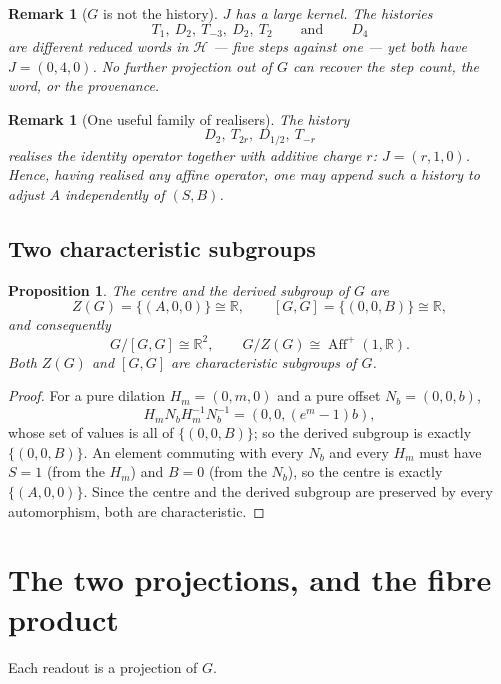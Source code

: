 \documentclass[11pt]{article}
\newtheorem{proposition}[theorem]{Proposition}
\newtheorem{remark}[theorem]{Remark}
\begin{document}
\begin{remark}[$G$ is not the history]
\label{rem:not-history}
$J$ has a large kernel. The histories
\[
T_1,\ D_2,\ T_{-3},\ D_2,\ T_2
\qquad\text{and}\qquad
D_4
\]
are different reduced words in $\mathcal H$ --- five steps against one --- yet
both have $J=(0,4,0)$. No further projection out of $G$ can recover the step
count, the word, or the provenance.
\end{remark}

\begin{remark}[One useful family of realisers]
The history
\[
D_2,\ T_{2r},\ D_{1/2},\ T_{-r}
\]
realises the identity operator together with additive charge $r$:
$J=(r,1,0)$. Hence, having realised any affine operator, one may append such a
history to adjust $A$ independently of $(S,B)$.
\end{remark}

\subsection{Two characteristic subgroups}
\label{subsec:characteristic}

\begin{proposition}
\label{prop:center-derived}
The centre and the derived subgroup of $G$ are
\[
Z(G)=\{(A,0,0)\}\cong\mathbb R,
\qquad
[G,G]=\{(0,0,B)\}\cong\mathbb R ,
\]
and consequently
\[
G/[G,G]\cong\mathbb R^2,\qquad G/Z(G)\cong\operatorname{Aff}^+(1,\mathbb R).
\]
Both $Z(G)$ and $[G,G]$ are characteristic subgroups of $G$.
\end{proposition}

\begin{proof}
For a pure dilation $H_m=(0,m,0)$ and a pure offset $N_b=(0,0,b)$,
\[
H_mN_bH_m^{-1}N_b^{-1}=(0,0,(e^m-1)b),
\]
whose set of values is all of $\{(0,0,B)\}$; so the derived subgroup is exactly
$\{(0,0,B)\}$. An element commuting with every $N_b$ and every $H_m$ must have
$S=1$ (from the $H_m$) and $B=0$ (from the $N_b$), so the centre is exactly
$\{(A,0,0)\}$. Since the centre and the derived subgroup are preserved by every
automorphism, both are characteristic.
\end{proof}

\section{The two projections, and the fibre product}
\label{sec:projections}

Each readout is a projection of $G$.
\end{document}
